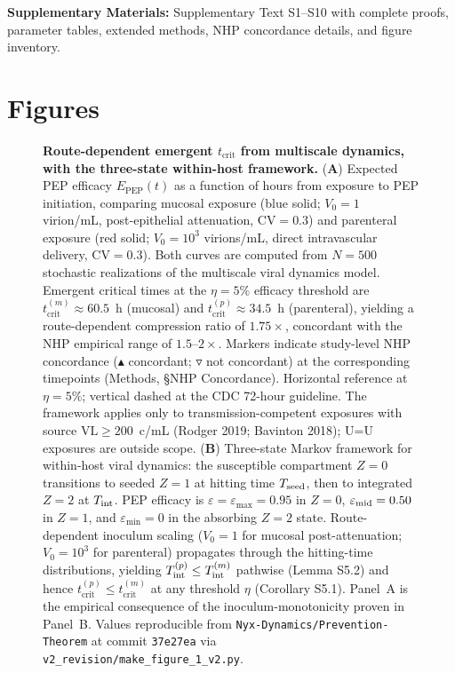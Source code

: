 \documentclass[10pt,letterpaper]{article}
\theoremstyle{definition}
\theoremstyle{remark}
\newcommand{\Epep}{E_{\text{PEP}}}
\newcommand{\tcrit}{t_{\text{crit}}}
\begin{document}
\textbf{Supplementary Materials:} Supplementary Text S1--S10 with complete proofs, parameter tables, extended methods, NHP concordance details, and figure inventory.


\newpage
\section*{Figures}

\begin{figure}[!ht]
\centering

\caption{\textbf{Route-dependent emergent $\tcrit$ from multiscale dynamics, with the three-state within-host framework.}
(\textbf{A}) Expected PEP efficacy $\Epep(t)$ as a function of hours from exposure to PEP initiation, comparing mucosal exposure (blue solid; $V_{0} = 1$ virion/mL, post-epithelial attenuation, $\text{CV} = 0.3$) and parenteral exposure (red solid; $V_{0} = 10^{3}$ virions/mL, direct intravascular delivery, $\text{CV} = 0.3$). Both curves are computed from $N = 500$ stochastic realizations of the multiscale viral dynamics model. Emergent critical times at the $\eta = 5\%$ efficacy threshold are $\tcrit^{(m)} \approx 60.5$~h (mucosal) and $\tcrit^{(p)} \approx 34.5$~h (parenteral), yielding a route-dependent compression ratio of $1.75\times$, concordant with the NHP empirical range of $1.5$--$2\times$. Markers indicate study-level NHP concordance (\(\blacktriangle\) concordant; \(\triangledown\) not concordant) at the corresponding timepoints (Methods, \S NHP Concordance). Horizontal reference at $\eta = 5\%$; vertical dashed at the CDC 72-hour guideline. The framework applies only to transmission-competent exposures with source $\text{VL} \geq 200$~c/mL (Rodger 2019; Bavinton 2018); U=U exposures are outside scope.
(\textbf{B}) Three-state Markov framework for within-host viral dynamics: the susceptible compartment $Z = 0$ transitions to seeded $Z = 1$ at hitting time $T_{\rm seed}$, then to integrated $Z = 2$ at $T_{\rm int}$. PEP efficacy is $\varepsilon = \varepsilon_{\max} = 0.95$ in $Z = 0$, $\varepsilon_{\rm mid} = 0.50$ in $Z = 1$, and $\varepsilon_{\min} = 0$ in the absorbing $Z = 2$ state. Route-dependent inoculum scaling ($V_{0} = 1$ for mucosal post-attenuation; $V_{0} = 10^{3}$ for parenteral) propagates through the hitting-time distributions, yielding $T_{\rm int}^{(p)} \leq T_{\rm int}^{(m)}$ pathwise (Lemma S5.2) and hence $\tcrit^{(p)} \leq \tcrit^{(m)}$ at any threshold $\eta$ (Corollary S5.1). Panel~A is the empirical consequence of the inoculum-monotonicity proven in Panel~B.
Values reproducible from \texttt{Nyx-Dynamics/Prevention-Theorem} at commit \texttt{37e27ea} via \texttt{v2\_revision/make\_figure\_1\_v2.py}.}
\label{fig:route}
\end{figure}
\end{document}
